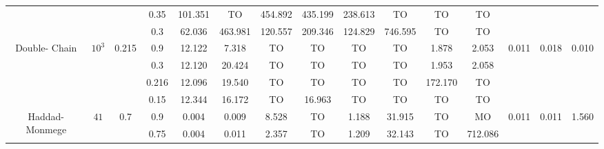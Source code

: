 \begin{table}
\begin{lrbox}{\lstbox}
\begin{minipage}{\textheight}
\begin{tabular}{ccccccccccccccc}
				                                               &                            &                           & \cellcolor{gray!25}0.35  & 101.351     & TO           & 454.892     & 435.199  & 238.613 & TO      & TO      & TO                                                                                               \\
				                                               &                            &                           & \cellcolor{gray!25}0.3   & 62.036      & 463.981      & 120.557     & 209.346  & 124.829 & 746.595 & TO      & TO                                                                                               \\
				\midrule
				\multirow{4}{*}{\parbox{4em}{Double- Chain}}   & \multirow{4}{*}{$10^3$}    & \multirow{4}{*}{0.215}    & 0.9                      & 12.122      & 7.318        & TO          & TO       & TO      & TO      & 1.878   & 2.053   & \multirow{4}{*}{0.011}             & \multirow{4}{*}{0.018}   & \multirow{4}{*}{0.010} \\
				                                               &                            &                           & 0.3                      & 12.120      & 20.424       & TO          & TO       & TO      & TO      & 1.953   & 2.058                                                                                            \\
				                                               &                            &                           & 0.216                    & 12.096      & 19.540       & TO          & TO       & TO      & TO      & 172.170 & TO                                                                                               \\
				                                               &                            &                           & \cellcolor{gray!25}0.15  & 12.344      & 16.172       & TO          & 16.963   & TO      & TO      & TO      & TO                                                                                               \\
				\midrule
				\multirow{4}{*}{\parbox{4em}{Haddad- Monmege}} & \multirow{2}{*}{$41$}      & \multirow{2}{*}{0.7}      & 0.9                      & 0.004       & 0.009        & 8.528       & TO       & 1.188   & 31.915  & TO      & MO      & \multirow{2}{*}{0.011}             & \multirow{2}{*}{0.011}   & \multirow{2}{*}{1.560} \\
				                                               &                            &                           & 0.75                     & 0.004       & 0.011        & 2.357       & TO       & 1.209   & 32.143  & TO      & 712.086                                                                                          \\

\end{tabular}
\end{minipage}
\end{lrbox}
\end{table}
